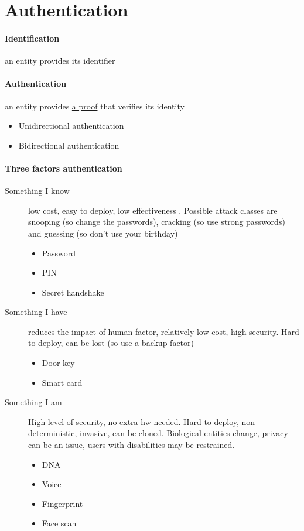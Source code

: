 \documentclass{article}
\begin{document}
\section{Authentication}
\paragraph{Identification} an entity provides its identifier
\paragraph{Authentication} an entity provides \underline{a proof} that verifies its identity
\begin{itemize}
\item Unidirectional authentication
\item Bidirectional authentication
\end{itemize}
\paragraph{Three factors authentication}
\begin{description}
\item[Something I know] low cost, easy to deploy, low effectiveness . Possible attack classes are snooping (so change the passwords), cracking (so use strong passwords) and guessing (so don't use your birthday)
	\begin{itemize}
		\item Password
		\item PIN
		\item Secret handshake
	\end{itemize}
\item[Something I have] reduces the impact of human factor, relatively low cost, high security. Hard to deploy, can be lost (so use a backup factor)
	\begin{itemize}
		\item Door key
		\item Smart card
	\end{itemize}
\item[Something I am] High level of security, no extra hw needed. Hard to deploy, non-deterministic, invasive, can be cloned. Biological entities change, privacy can be an issue, users with disabilities may be restrained.
	\begin{itemize}
		\item DNA
		\item Voice
		\item Fingerprint
		\item Face scan
	\end{itemize}
\end{description}
\end{document}
